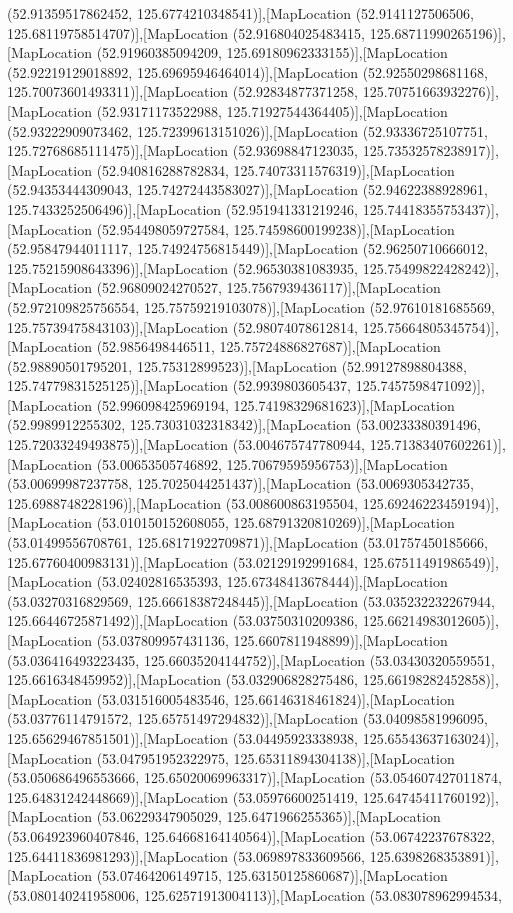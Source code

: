 (52.91359517862452, 125.6774210348541)],[MapLocation (52.9141127506506, 125.68119758514707)],[MapLocation (52.916804025483415, 125.68711990265196)],[MapLocation (52.91960385094209, 125.69180962333155)],[MapLocation (52.92219129018892, 125.69695946464014)],[MapLocation (52.92550298681168, 125.70073601493311)],[MapLocation (52.92834877371258, 125.70751663932276)],[MapLocation (52.93171173522988, 125.71927544364405)],[MapLocation (52.93222909073462, 125.72399613151026)],[MapLocation (52.93336725107751, 125.72768685111475)],[MapLocation (52.93698847123035, 125.73532578238917)],[MapLocation (52.940816288782834, 125.74073311576319)],[MapLocation (52.94353444309043, 125.74272443583027)],[MapLocation (52.94622388928961, 125.7433252506496)],[MapLocation (52.951941331219246, 125.74418355753437)],[MapLocation (52.954498059727584, 125.74598600199238)],[MapLocation (52.95847944011117, 125.74924756815449)],[MapLocation (52.96250710666012, 125.75215908643396)],[MapLocation (52.96530381083935, 125.75499822428242)],[MapLocation (52.96809024270527, 125.7567939436117)],[MapLocation (52.972109825756554, 125.75759219103078)],[MapLocation (52.97610181685569, 125.75739475843103)],[MapLocation (52.98074078612814, 125.75664805345754)],[MapLocation (52.9856498446511, 125.75724886827687)],[MapLocation (52.98890501795201, 125.75312899523)],[MapLocation (52.99127898804388, 125.74779831525125)],[MapLocation (52.9939803605437, 125.7457598471092)],[MapLocation (52.996098425969194, 125.74198329681623)],[MapLocation (52.9989912255302, 125.73031032318342)],[MapLocation (53.00233380391496, 125.72033249493875)],[MapLocation (53.004675747780944, 125.71383407602261)],[MapLocation (53.00653505746892, 125.70679595956753)],[MapLocation (53.00699987237758, 125.7025044251437)],[MapLocation (53.0069305342735, 125.6988748228196)],[MapLocation (53.008600863195504, 125.69246223459194)],[MapLocation (53.010150152608055, 125.68791320810269)],[MapLocation (53.01499556708761, 125.68171922709871)],[MapLocation (53.01757450185666, 125.67760400983131)],[MapLocation (53.02129192991684, 125.67511491986549)],[MapLocation (53.02402816535393, 125.67348413678444)],[MapLocation (53.03270316829569, 125.66618387248445)],[MapLocation (53.035232232267944, 125.66446725871492)],[MapLocation (53.03750310209386, 125.66214983012605)],[MapLocation (53.037809957431136, 125.6607811948899)],[MapLocation (53.036416493223435, 125.66035204144752)],[MapLocation (53.03430320559551, 125.6616348459952)],[MapLocation (53.032906828275486, 125.66198282452858)],[MapLocation (53.031516005483546, 125.66146318461824)],[MapLocation (53.03776114791572, 125.65751497294832)],[MapLocation (53.04098581996095, 125.65629467851501)],[MapLocation (53.04495923338938, 125.65543637163024)],[MapLocation (53.047951952322975, 125.65311894304138)],[MapLocation (53.050686496553666, 125.65020069963317)],[MapLocation (53.054607427011874, 125.64831242448669)],[MapLocation (53.05976600251419, 125.64745411760192)],[MapLocation (53.06229347905029, 125.6471966255365)],[MapLocation (53.064923960407846, 125.64668164140564)],[MapLocation (53.06742237678322, 125.64411836981293)],[MapLocation (53.069897833609566, 125.6398268353891)],[MapLocation (53.07464206149715, 125.63150125860687)],[MapLocation (53.080140241958006, 125.62571913004113)],[MapLocation (53.083078962994534, 